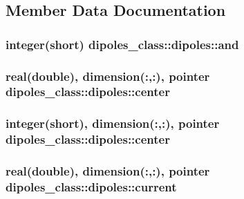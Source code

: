 \subsection{Member Data Documentation}
\hypertarget{structdipoles__class_1_1dipoles_a7009b45719053d38b8b082f1505127cd}{
\subsubsection[{and}]{\setlength{\rightskip}{0pt plus 5cm}integer(short) dipoles\+\_\+class\+::dipoles\+::and\hspace{0.3cm}{\ttfamily [private]}}}\label{structdipoles__class_1_1dipoles_a7009b45719053d38b8b082f1505127cd}
\hypertarget{structdipoles__class_1_1dipoles_ab7c31b6af230c4668d6fd24b359836bf}{
\subsubsection[{center}]{\setlength{\rightskip}{0pt plus 5cm}real(double), dimension(\+:,\+:), pointer dipoles\+\_\+class\+::dipoles\+::center\hspace{0.3cm}{\ttfamily [private]}}}\label{structdipoles__class_1_1dipoles_ab7c31b6af230c4668d6fd24b359836bf}
\hypertarget{structdipoles__class_1_1dipoles_a959e48d8726c84ad96695f27f5a324df}{
\subsubsection[{center}]{\setlength{\rightskip}{0pt plus 5cm}integer(short), dimension(\+:,\+:), pointer dipoles\+\_\+class\+::dipoles\+::center\hspace{0.3cm}{\ttfamily [private]}}}\label{structdipoles__class_1_1dipoles_a959e48d8726c84ad96695f27f5a324df}
\hypertarget{structdipoles__class_1_1dipoles_a1f7d8ab8bd71a85a74e56b5461023742}{
\subsubsection[{current}]{\setlength{\rightskip}{0pt plus 5cm}real(double), dimension(\+:,\+:), pointer dipoles\+\_\+class\+::dipoles\+::current\hspace{0.3cm}{\ttfamily [private]}}}\label{structdipoles__class_1_1dipoles_a1f7d8ab8bd71a85a74e56b5461023742}
